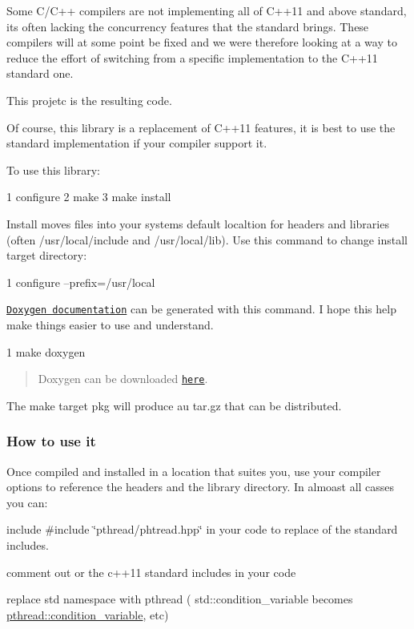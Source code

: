 Some C/\+C++ compilers are not implementing all of C++11 and above standard, it\textquotesingle{}s often lacking the concurrency features that the standard brings. These compilers will at some point be fixed and we were therefore looking at a way to reduce the effort of switching from a specific implementation to the C++11 standard one.

This projetc is the resulting code.

Of course, this library is a replacement of C++11 features, it is best to use the standard implementation if your compiler support it.

To use this library\+: 
\begin{DoxyCode}
1 configure
2 make
3 make install
\end{DoxyCode}


Install moves files into your system\textquotesingle{}s default localtion for headers and libraries (often /usr/local/include and /usr/local/lib). Use this command to change install target directory\+: 
\begin{DoxyCode}
1 configure --prefix=/usr/local
\end{DoxyCode}


\href{http://herbertkoelman.github.io/cpp-pthread/doc/html/}{\tt Doxygen documentation} can be generated with this command. I hope this help make things easier to use and understand. 
\begin{DoxyCode}
1 make doxygen
\end{DoxyCode}


\begin{quote}
Doxygen can be downloaded \href{http://www.stack.nl/~dimitri/doxygen/index.html}{\tt here}. \end{quote}


The {\ttfamily make} target {\ttfamily pkg} will produce au tar.\+gz that can be distributed.

\subsubsection*{How to use it}

Once compiled and installed in a location that suites you, use your compiler options to reference the headers and the library directory. In almoast all casses you can\+:
\begin{DoxyItemize}
\item include {\ttfamily \#include \char`\"{}pthread/phtread.\+hpp\char`\"{}} in your code to replace of the standard includes.
\item comment out or the c++11 standard includes in your code
\item replace {\ttfamily std} namespace with {\ttfamily pthread} ( std\+::condition\+\_\+variable becomes \hyperlink{classpthread_1_1condition__variable}{pthread\+::condition\+\_\+variable}, etc)
\end{DoxyItemize}

